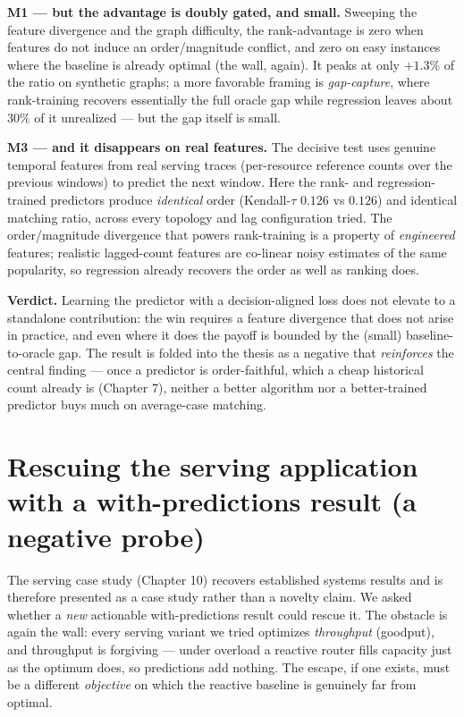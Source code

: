 \textbf{M1 --- but the advantage is doubly gated, and small.} Sweeping the feature divergence and
the graph difficulty, the rank-advantage is zero when features do not induce an
order/magnitude conflict, and zero on easy instances where the baseline is already optimal
(the wall, again). It peaks at only \(+1.3\%\) of the ratio on synthetic graphs; a more
favorable framing is \emph{gap-capture}, where rank-training recovers essentially the full oracle
gap while regression leaves about \(30\%\) of it unrealized --- but the gap itself is small.

\textbf{M3 --- and it disappears on real features.} The decisive test uses genuine temporal
features from real serving traces (per-resource reference counts over the previous windows)
to predict the next window. Here the rank- and regression-trained predictors produce
\emph{identical} order (Kendall-\(\tau\) \(0.126\) vs \(0.126\)) and identical matching ratio, across
every topology and lag configuration tried. The order/magnitude divergence that powers
rank-training is a property of \emph{engineered} features; realistic lagged-count features are
co-linear noisy estimates of the same popularity, so regression already recovers the order
as well as ranking does.

\textbf{Verdict.} Learning the predictor with a decision-aligned loss does not elevate to a
standalone contribution: the win requires a feature divergence that does not arise in
practice, and even where it does the payoff is bounded by the (small) baseline-to-oracle
gap. The result is folded into the thesis as a negative that \emph{reinforces} the central
finding --- once a predictor is order-faithful, which a cheap historical count already is
(Chapter 7), neither a better algorithm nor a better-trained predictor buys much on
average-case matching.

\section{Rescuing the serving application with a with-predictions result (a negative probe)}\label{rescuing-the-serving-application-with-a-with-predictions-result-a-negative-probe}

The serving case study (Chapter 10) recovers established systems results and is therefore
presented as a case study rather than a novelty claim. We asked whether a \emph{new} actionable
with-predictions result could rescue it. The obstacle is again the wall: every serving
variant we tried optimizes \emph{throughput} (goodput), and throughput is forgiving --- under
overload a reactive router fills capacity just as the optimum does, so predictions add
nothing. The escape, if one exists, must be a different \emph{objective} on which the reactive
baseline is genuinely far from optimal.

